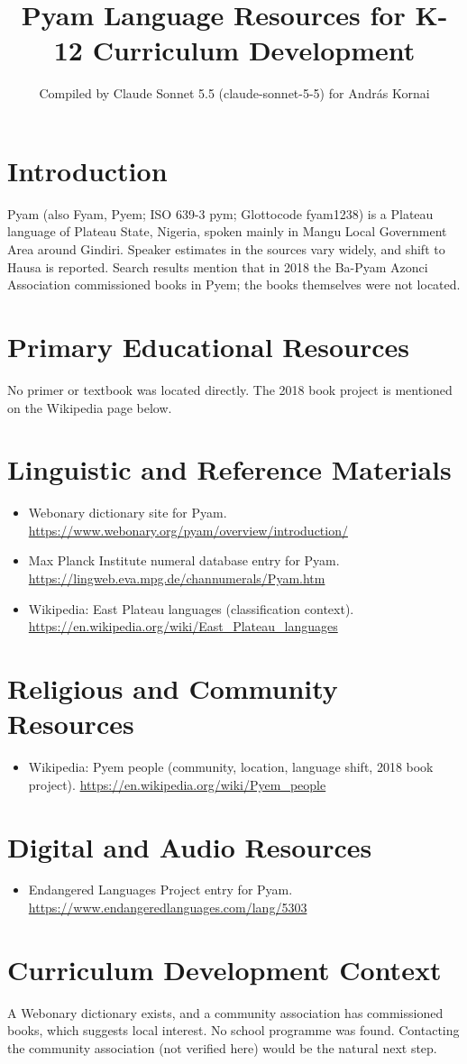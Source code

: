 \documentclass[12pt]{article}
\title{Pyam Language Resources for K-12 Curriculum Development}
\author{Compiled by Claude Sonnet 5.5 (claude-sonnet-5-5) for Andr\'as Kornai}
\date{}
\begin{document}
\maketitle

\section{Introduction}
Pyam (also Fyam, Pyem; ISO 639-3 pym; Glottocode fyam1238) is a Plateau language of Plateau State, Nigeria, spoken mainly in Mangu Local Government Area around Gindiri. Speaker estimates in the sources vary widely, and shift to Hausa is reported. Search results mention that in 2018 the Ba-Pyam Azonci Association commissioned books in Pyem; the books themselves were not located.

\section{Primary Educational Resources}
No primer or textbook was located directly. The 2018 book project is mentioned on the Wikipedia page below.

\section{Linguistic and Reference Materials}
\begin{itemize}
\item Webonary dictionary site for Pyam. \url{https://www.webonary.org/pyam/overview/introduction/}
\item Max Planck Institute numeral database entry for Pyam. \url{https://lingweb.eva.mpg.de/channumerals/Pyam.htm}
\item Wikipedia: East Plateau languages (classification context). \url{https://en.wikipedia.org/wiki/East_Plateau_languages}
\end{itemize}

\section{Religious and Community Resources}
\begin{itemize}
\item Wikipedia: Pyem people (community, location, language shift, 2018 book project). \url{https://en.wikipedia.org/wiki/Pyem_people}
\end{itemize}

\section{Digital and Audio Resources}
\begin{itemize}
\item Endangered Languages Project entry for Pyam. \url{https://www.endangeredlanguages.com/lang/5303}
\end{itemize}

\section{Curriculum Development Context}
A Webonary dictionary exists, and a community association has commissioned books, which suggests local interest. No school programme was found. Contacting the community association (not verified here) would be the natural next step.
\end{document}
